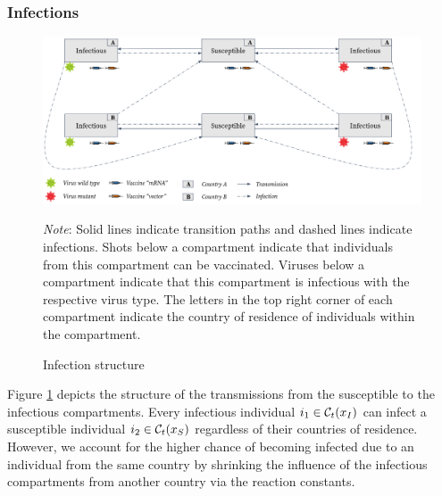 \subsubsection{Infections}
\begin{figure}[h!]
\centering
\includegraphics[scale=0.3]{images/overview_infection.png}\\
\begin{flushleft}
\scriptsize{\textit{Note}: Solid lines indicate transition paths and dashed lines indicate infections. Shots below a compartment indicate that individuals from this compartment can be vaccinated. Viruses below a compartment indicate that this compartment is infectious with the respective virus type. The letters in the top right corner of each compartment indicate the country of residence of individuals within the compartment.}
\end{flushleft}
\caption{Infection structure}
\label{fig:model_infections}
\end{figure}
Figure \ref{fig:model_infections} depicts the structure of the transmissions from the susceptible to the infectious compartments. Every infectious individual $i_1 \in \mathcal{C}_t(x_I)$ can infect a susceptible individual $i_2 \in \mathcal{C}_t(x_S)$ regardless of their countries of residence. However, we account for the higher chance of becoming infected due to an individual from the same country by shrinking the influence of the infectious compartments from another country via the reaction constants. \\

